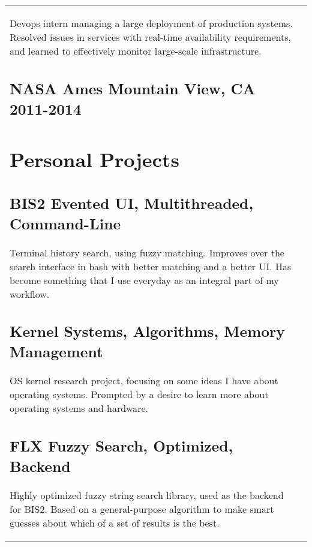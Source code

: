 \documentclass[letterpaper]{article}
\newlength{\leftcol}
\newlength{\rightcol}
\newcommand{\subtitle}{\normalfont\sffamily\color{black}\large}
\begin{document}
\begin{tabularx}{\textwidth}{@{}p{\leftcol} p{\rightcol}}
Devops intern managing a large deployment of production systems. Resolved issues
in services with real-time availability requirements, and learned to effectively
monitor large-scale infrastructure.

\subsection*{NASA Ames \subtitle \hfill Mountain View, CA 2011-2014}


\section*{Personal Projects}

\subsection*{BIS2 \subtitle \hfill Evented UI, Multithreaded, Command-Line}

Terminal history search, using fuzzy matching. Improves over the search interface
in bash with better matching and a better UI. Has become something that I use
everyday as an integral part of my workflow.

\subsection*{Kernel \subtitle \hfill Systems, Algorithms, Memory Management}

OS kernel research project, focusing on some ideas I have about operating
systems. Prompted by a desire to learn more about operating systems and
hardware.

\subsection*{FLX \subtitle \hfill Fuzzy Search, Optimized, Backend}

Highly optimized fuzzy string search library, used as the backend for BIS2.
Based on a general-purpose algorithm to make smart guesses about which of a set
of results is the best.
\end{tabularx}
\end{document}
